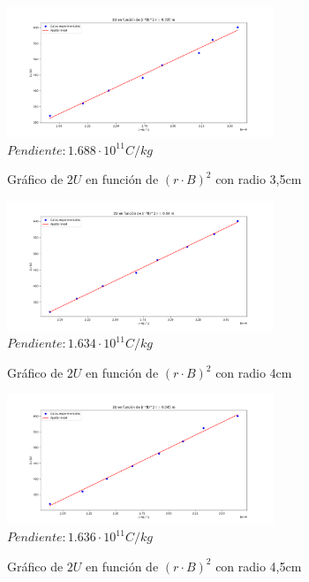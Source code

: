 \documentclass[a4paper]{article}
\begin{document}
    \begin{figure}[h!]
        \centering
        \vspace{-2mm}
        \includegraphics[width = 8cm] {../imagenes/radio3,5.png}
        \textbf{$Pendiente: 1.688 \cdot 10^{11} C/kg$}
        \caption{Gráfico de $2U$ en función de $(r \cdot B)^2$ con radio 3,5cm}
        \vspace{-5mm}
    \end{figure}

    \begin{figure}[h!]
        \centering
        \vspace{-2mm}
        \includegraphics[width = 8cm] {../imagenes/radio4.png}
        \textbf{$Pendiente: 1.634 \cdot 10^{11} C/kg$}
        \caption{Gráfico de $2U$ en función de $(r \cdot B)^2$ con radio 4cm}
        \vspace{-5mm}
    \end{figure}

    \begin{figure}[h!]
        \vspace{-2mm}
        \centering
        \includegraphics[width = 8cm] {../imagenes/radio4,5.png}
        \textbf{$Pendiente: 1.636 \cdot 10^{11} C/kg$}
        \caption{Gráfico de $2U$ en función de $(r \cdot B)^2$ con radio 4,5cm}
        \vspace{-5mm}
    \end{figure}
\end{document}
